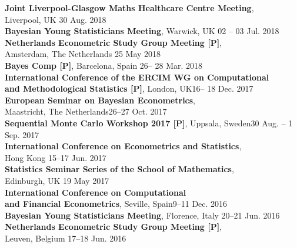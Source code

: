 \documentclass[margin,line]{resume}
\begin{document}
\begin{resume}
	\textbf{ Joint Liverpool-Glasgow Maths Healthcare Centre Meeting},\\
	Liverpool, UK \hfill 30 Aug. 2018 \vspace{1mm} \\	
	\textbf{ Bayesian Young Statisticians Meeting}, Warwick, UK \hfill 02 -- 03 Jul. 2018 \vspace{1mm} \\
	\textbf{ Netherlands Econometric Study Group Meeting [P]}, \\
	Amsterdam, The Netherlands \hfill 25 May 2018  \vspace{1mm} \\ 
	\textbf{ Bayes Comp [P]}, Barcelona, Spain \hfill 26-- 28 Mar. 2018 \vspace{1mm} \\
	\textbf{ International Conference of the ERCIM WG on Computational}\\
	\textbf{and Methodological Statistics [P]}, London, UK\hfill 16-- 18 Dec. 2017 \vspace{1mm} \\ 	
	\textbf{ European Seminar on Bayesian Econometrics},\\
	 Maastricht, The Netherlands\hfill 26--27 Oct. 2017 \vspace{1mm} \\ 
	\textbf{Sequential Monte Carlo Workshop 2017 [P]}, Uppsala, Sweden\hfill 30 Aug. -- 1 Sep. 2017 \vspace{1mm} \\ 
	\textbf{ International Conference on Econometrics and Statistics},\\ Hong Kong \hfill 15--17 Jun. 2017 \vspace{1mm} \\ 
    \textbf{Statistics Seminar Series of the School of Mathematics},\\ Edinburgh, UK \hfill 19 May 2017 \vspace{1mm} \\ 
    \textbf{ International Conference on Computational \\ and Financial Econometrics},  Seville, Spain\hfill 9--11 Dec. 2016  \vspace{1mm} \\ 
	\textbf{ Bayesian Young Statisticians Meeting}, Florence, Italy \hfill 20--21 Jun. 2016  \vspace{1mm} \\ 
	\textbf{ Netherlands Econometric Study Group Meeting [P]},\\
    Leuven, Belgium \hfill 17--18 Jun. 2016  \vspace{1mm} \\ 
  



\end{resume}
\end{document}
